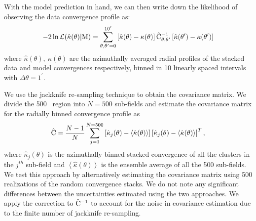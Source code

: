 With the model prediction in hand, we can then write down the likelihood of observing the data convergence profile as: 
\begin{equation}
-2\ln\mathcal{L (\hat{\kappa}(\theta)| \rm{M}}) = 
\sum_{\theta, \theta^{\prime} = 0}^{10^{\prime}}\left[\hat{\kappa}(\theta) - \kappa(\theta)\right] \hat{{\rm C}}_{\theta, \theta^{\prime}}^{-1} \left[\hat{\kappa}(\theta^{\prime}) - \kappa(\theta^{\prime})\right]
\label{eq_QE_likelihood}
\end{equation}
where $\hat{\kappa}(\theta),\ \kappa(\theta)$ are the azimuthally averaged radial profiles of the stacked data and model convergences respectively, binned in 10 linearly spaced intervals with $\Delta\theta = 1^{\prime}$. %


We use the jackknife re-sampling technique to obtain the covariance matrix. We divide the \sptpol{} 500 \sqdeg\ region into $N=500$ sub-fields and estimate the covariance matrix for the radially binned convergence profile as 
\begin{equation}
\hat{{\rm C}} = \frac{N-1}{N} \sum\limits_{j=1}^{N = 500} \left[\hat{\kappa}_{j}(\theta) - \left<\hat{\kappa}(\theta)\right>\right] \left[\hat{\kappa}_{j}(\theta) - \left<\hat{\kappa}(\theta)\right>\right]^{T},
\label{eq_JK_cov}
\end{equation}
where $\hat{\kappa}_{j}(\theta)$ is the azimuthally binned stacked convergence of all the clusters in the $j^{th}$ sub-field and  $\left<\hat{\kappa}(\theta)\right>$ is the ensemble average of all the 500 sub-fields.
We test this approach by alternatively estimating the covariance matrix using 500 realizations of the random convergence stacks. 
We do not note any significant differences between the uncertainties estimated using the two approaches. 
We apply the \citet{hartlap06} correction to $\hat{{\rm C}}^{-1}$ to account for the noise in covariance estimation due to the finite number of jackknife re-sampling.


